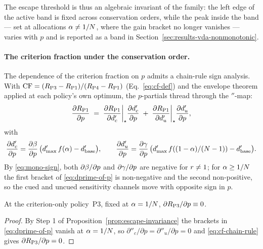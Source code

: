 The escape threshold is thus an algebraic invariant of the family: the
left edge of the active band is fixed across conservation orders, while
the peak inside the band — set at allocations $\alpha \ne 1/N$, where
the gain bracket no longer vanishes — varies with $p$ and is reported as
a band in Section~\ref{sec:results-vda-nonmonotonic}.

\paragraph{The criterion fraction under the conservation order.}
The dependence of the criterion fraction on $p$ admits a chain-rule sign
analysis. With $\mathrm{CF} = (R_{\mathrm{P3}} - R_{\mathrm{P1}})/(R_{\mathrm{P4}} - R_{\mathrm{P1}})$
(Eq.~\ref{eq:cf-def}) and the envelope theorem applied at each policy's
own optimum, the $p$-partials thread through the $\dprime$-map:
\begin{equation}
  \frac{\partial R_{\mathrm{P1}}}{\partial p}
  \;=\;
  \frac{\partial R_{\mathrm{P1}}}{\partial d'_c}\bigg|_{\star}
  \frac{\partial d'_c}{\partial p}
  \;+\;
  \frac{\partial R_{\mathrm{P1}}}{\partial d'_u}\bigg|_{\star}
  \frac{\partial d'_u}{\partial p},
  \label{eq:cf-chain-rule}
\end{equation}
with
\begin{equation}
  \frac{\partial d'_c}{\partial p}
  = \frac{\partial \beta}{\partial p}\,
    \big(d'_{\max}\, f(\alpha) - d'_{\mathrm{base}}\big),
  \qquad
  \frac{\partial d'_u}{\partial p}
  = \frac{\partial \gamma}{\partial p}\,
    \big(d'_{\max}\, f((1 - \alpha)/(N - 1)) - d'_{\mathrm{base}}\big).
  \label{eq:dprime-of-p}
\end{equation}
By \eqref{eq:mono-sign}, both $\partial \beta/\partial p$ and
$\partial \gamma/\partial p$ are negative for $r \ne 1$; for
$\alpha \ge 1/N$ the first bracket of \eqref{eq:dprime-of-p} is
non-negative and the second non-positive, so the cued and uncued
sensitivity channels move with opposite sign in $p$.

\begin{proposition}
\label{prop:p3-invariance}
At the criterion-only policy~P3, fixed at $\alpha = 1/N$,
$\partial R_{\mathrm{P3}} / \partial p \equiv 0$.
\end{proposition}

\begin{proof}
By Step 1 of Proposition~\ref{prop:escape-invariance} the brackets in
\eqref{eq:dprime-of-p} vanish at $\alpha = 1/N$, so
$\partial \dprime_c/\partial p = \partial \dprime_u/\partial p = 0$ and
\eqref{eq:cf-chain-rule} gives $\partial R_{\mathrm{P3}}/\partial p = 0$.
\end{proof}

